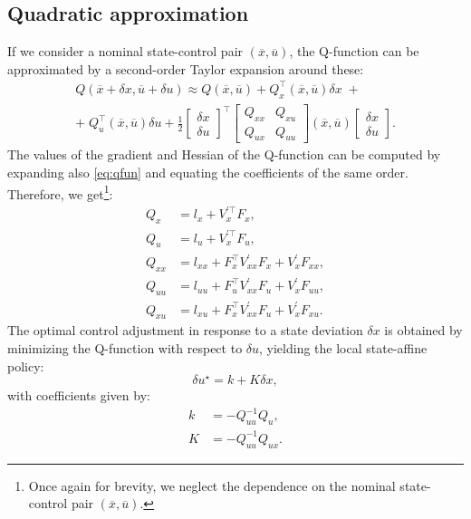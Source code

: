 \subsection{Quadratic approximation}
If we consider a nominal state-control pair $(\overline{x}, \overline{u})$, the Q-function can be approximated by a second-order Taylor expansion around these:
\begin{gather}\label{eq:qfun_taylor}
    Q(\overline{x}+\delta x, \overline{u}+\delta u) \approx Q(\overline{x}, \overline{u}) + Q_x^\top(\overline{x}, \overline{u}) \delta x\;+ \nonumber \\
    +\;Q_u^\top(\overline{x}, \overline{u}) \delta u + \frac{1}{2} \begin{bmatrix} \delta x \\ \delta u \end{bmatrix}^\top \begin{bmatrix}Q_{xx} & Q_{xu} \\ Q_{ux}  & Q_{uu} \end{bmatrix}(\overline{x}, \overline{u}) \begin{bmatrix} \delta x \\ \delta u \end{bmatrix}.
\end{gather}
The values of the gradient and Hessian of the Q-function can be computed by expanding also \ref{eq:qfun} and equating the coefficients of the same order. Therefore, we get\footnote{Once again for brevity, we neglect the dependence on the nominal state-control pair $(\overline{x}, \overline{u})$.}:
\begin{align}
    Q_x &= l_x + V^{\prime\top}_x F_x, \label{eq:qx} \\ 
    Q_u &= l_u + V^{\prime\top}_x F_u, \\
    Q_{xx} &= l_{xx} + F_x^\top V^\prime_{xx} F_x + V^\prime_x F_{xx},\\
    Q_{uu} &= l_{uu} + F_u^\top V^\prime_{xx} F_u + V^\prime_x F_{uu},\\
    Q_{xu} &= l_{xu} + F_x^\top V^\prime_{xx} F_u + V^\prime_x F_{xu}. \label{eq:qxu}
\end{align}
The optimal control adjustment in response to a state deviation $\delta x$ is obtained by minimizing the Q-function with respect to $\delta u$, yielding the local state-affine policy:
\begin{equation}
    \delta u^\star = k + K \delta x, \label{eq:deltau_star}
\end{equation}
with coefficients given by:
\begin{align}
    k &= -Q_{uu}^{-1} Q_u, \label{eq:k} \\ 
    K &= -Q_{uu}^{-1} Q_{ux}. \label{eq:K}
\end{align}
